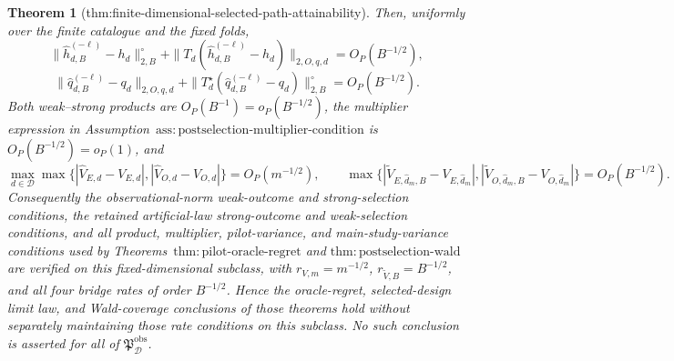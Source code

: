 \documentclass{article}
\newtheorem{theorem}{Theorem}
\begin{document}
\begin{theorem}[thm:finite-dimensional-selected-path-attainability]
Then, uniformly over the finite catalogue and the fixed folds,
\[
 \|\widehat h_{d,B}^{(-\ell)}-h_d\|_{2,B}^{\circ}
 +\|T_d(\widehat h_{d,B}^{(-\ell)}-h_d)\|_{2,O,q,d}
 =O_P(B^{-1/2}),                                               \tag{5}
\]
\[
 \|\widehat q_{d,B}^{(-\ell)}-q_d\|_{2,O,q,d}
 +\|T_d^\star(\widehat q_{d,B}^{(-\ell)}-q_d)\|_{2,B}^{\circ}
 =O_P(B^{-1/2}).                                               \tag{6}
\]
Both weak--strong products are \(O_P(B^{-1})=o_P(B^{-1/2})\), the multiplier expression in Assumption~\(\mathrm{ass{:}postselection\text{-}multiplier\text{-}condition}\) is \(O_P(B^{-1/2})=o_P(1)\), and
\[
 \max_{d\in\mathcal D}\max\bigl\{
 |\widehat V_{E,d}-V_{E,d}|,
 |\widehat V_{O,d}-V_{O,d}|\bigr\}=O_P(m^{-1/2}),
 \qquad
 \max\bigl\{
 |\widetilde V_{E,\widehat d_m,B}-V_{E,\widehat d_m}|,
 |\widetilde V_{O,\widehat d_m,B}-V_{O,\widehat d_m}|\bigr\}
 =O_P(B^{-1/2}).                                               \tag{7}
\]
Consequently the observational-norm weak-outcome and strong-selection conditions, the retained artificial-law strong-outcome and weak-selection conditions, and all product, multiplier, pilot-variance, and main-study-variance conditions used by Theorems~\(\mathrm{thm{:}pilot\text{-}oracle\text{-}regret}\) and \(\mathrm{thm{:}postselection\text{-}wald}\) are verified on this fixed-dimensional subclass, with \(r_{V,m}=m^{-1/2}\), \(r_{\widetilde V,B}=B^{-1/2}\), and all four bridge rates of order \(B^{-1/2}\).  Hence the oracle-regret, selected-design limit law, and Wald-coverage conclusions of those theorems hold without separately maintaining those rate conditions on this subclass.  No such conclusion is asserted for all of \(\mathfrak P_{\mathcal D}^{\mathrm{obs}}\).
\end{theorem}
\end{document}
